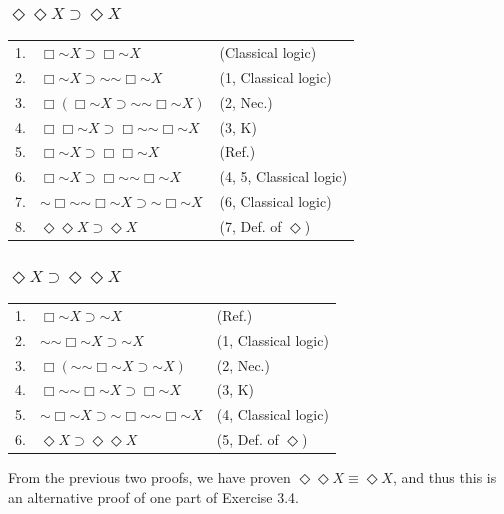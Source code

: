 \documentclass{article}
\newcommand*{\oldneg}{\mathord{\sim}}
\theoremstyle{definition}
\begin{document}
\subsubsection*{$\Diamond\Diamond X\supset\Diamond X$}
\begin{center}
\begin{tabular}{lll}
1. & $\Box\oldneg X\supset\Box\oldneg X$ & (Classical logic) \\
2. & $\Box\oldneg X\supset\oldneg\oldneg\Box\oldneg X$ & (1, Classical logic) \\
3. & $\Box(\Box\oldneg X\supset\oldneg\oldneg\Box\oldneg X)$ & (2, Nec.) \\
4. & $\Box\Box\oldneg X\supset\Box\oldneg\oldneg\Box\oldneg X$ & (3, K) \\
5. & $\Box\oldneg X\supset\Box\Box\oldneg X$ & (Ref.) \\
6. & $\Box\oldneg X\supset\Box\oldneg\oldneg\Box\oldneg X$ & (4, 5, Classical logic) \\
7. & $\oldneg\Box\oldneg\oldneg\Box\oldneg X\supset\oldneg\Box\oldneg X$ & (6, Classical logic) \\
8. & $\Diamond\Diamond X\supset\Diamond X$ & (7, Def. of $\Diamond$)
\end{tabular}
\end{center}

\subsubsection*{$\Diamond X\supset\Diamond\Diamond X$}
\begin{center}
\begin{tabular}{lll}
1. & $\Box\oldneg X\supset\oldneg X$ & (Ref.) \\
2. & $\oldneg\oldneg\Box\oldneg X\supset\oldneg X$ & (1, Classical logic) \\
3. & $\Box(\oldneg\oldneg\Box\oldneg X\supset\oldneg X)$ & (2, Nec.) \\
4. & $\Box\oldneg\oldneg\Box\oldneg X\supset\Box\oldneg X$ & (3, K) \\
5. & $\oldneg\Box\oldneg X\supset\oldneg\Box\oldneg\oldneg\Box\oldneg X$ & (4, Classical logic) \\
6. & $\Diamond X\supset\Diamond\Diamond X$ & (5, Def. of $\Diamond$)
\end{tabular}
\end{center}

From the previous two proofs, we have proven $\Diamond\Diamond X\equiv\Diamond X$, and thus this is an alternative 
proof of one part of Exercise 3.4. 
\end{document}
